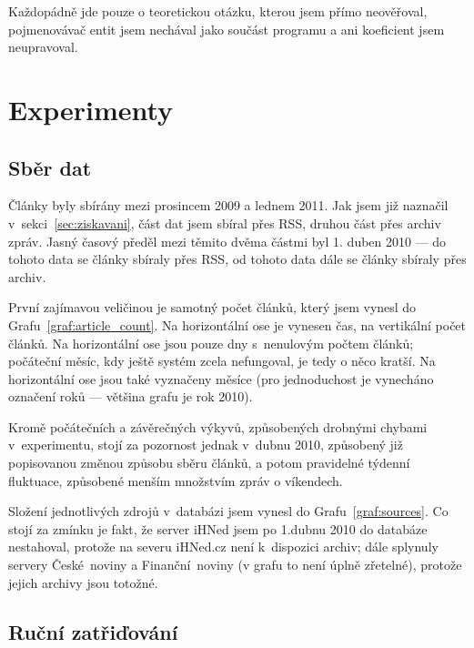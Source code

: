 \documentclass[12pt,a4paper]{report}
\begin{document}
Každopádně jde pouze o teoretickou otázku, kterou jsem přímo neověřoval, pojmenovávač entit jsem nechával jako součást programu a ani koeficient jsem neupravoval.


\chapter{Experimenty}
\label{sec:experimenty}


\section {Sběr dat}
\label{sec:sberdat}

Články byly sbírány mezi prosincem 2009 a lednem 2011. Jak jsem již naznačil v~sekci~\ref{sec:ziskavani}, část dat jsem sbíral přes RSS, druhou část přes archiv zpráv. Jasný časový předěl mezi těmito dvěma částmi byl 1. duben 2010 --- do tohoto data se články sbíraly přes RSS, od tohoto data dále se články sbíraly přes archiv.


První zajímavou veličinou je samotný počet článků, který jsem vynesl do Grafu~\ref{graf:article_count}. Na horizontální ose je vynesen čas, na vertikální počet článků. Na horizontální ose jsou pouze dny s~nenulovým počtem článků; počáteční měsíc, kdy ještě systém zcela nefungoval, je tedy o něco kratší. Na horizontální ose jsou také vyznačeny měsíce (pro jednoduchost je vynecháno označení roků --- většina grafu je rok 2010).

Kromě počátečních a závěrečných výkyvů, způsobených drobnými chybami v~experimentu, stojí za pozornost jednak  v~dubnu 2010, způsobený již popisovanou změnou způsobu sběru článků, a potom pravidelné týdenní fluktuace, způsobené menším množstvím zpráv o víkendech.


Složení jednotlivých zdrojů v~databázi jsem vynesl do Grafu~\ref{graf:sources}. Co stojí za zmínku je fakt, že server iHNed jsem po 1.dubnu 2010 do databáze nestahoval, protože na severu iHNed.cz není k~dispozici archiv; dále splynuly servery České~noviny a Finanční~noviny (v grafu to není úplně zřetelné), protože jejich archivy jsou totožné.

\section{Ruční zatřiďování}
\label{sec:rucnik}
\end{document}
